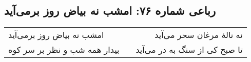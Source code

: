 \begin{center}
\section*{رباعی شماره ۷۶: امشب نه بیاض روز برمی‌آید}
\label{sec:076}
\begin{longtable}{l p{0.5cm} r}
امشب نه بیاض روز برمی‌آید
&&
نه نالهٔ مرغان سحر می‌آید
\\
بیدار همه شب و نظر بر سر کوه
&&
تا صبح کی از سنگ به در می‌آید
\\
\end{longtable}
\end{center}
